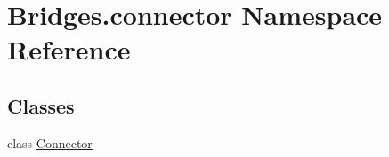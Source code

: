 \hypertarget{namespace_bridges_1_1connector}{}\section{Bridges.\+connector Namespace Reference}
\label{namespace_bridges_1_1connector}
\subsection*{Classes}
\begin{DoxyCompactItemize}
\item 
class \hyperlink{class_bridges_1_1connector_1_1_connector}{Connector}
\end{DoxyCompactItemize}

